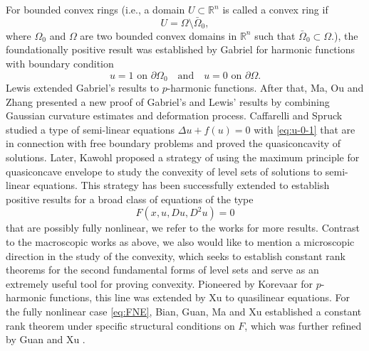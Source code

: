\documentclass[reqno]{amsart}
\theoremstyle{remark}
\theoremstyle{definition}
\numberwithin{equation}{section}
\begin{document}
For bounded convex rings (i.e., a domain $U\subset\mathbb{R}^n$ is called a convex ring if $$U=\Omega\setminus\bar{\Omega}_0,$$ 
where $\Omega_0$ and $\Omega$ are two bounded convex domains in $\mathbb{R}^n$ such that $\bar{\Omega}_0\subset\Omega$.), the foundationally positive result was established by Gabriel \cite{Gabriel-1957} for harmonic functions with boundary condition
\begin{equation}\label{eq:u-0-1}
	u=1\text{ on }\partial\Omega_0\quad\text{and}\quad u=0\text{ on }\partial\Omega.
\end{equation}
Lewis \cite{Lewis-1977} extended Gabriel's results to $p$-harmonic functions. After that, Ma, Ou and Zhang \cite{Ma-Ou-Zhang-CPAM} presented a new proof of Gabriel's and Lewis' results by combining Gaussian curvature estimates and deformation process. Caffarelli and Spruck \cite{Caffarelli-Spruck-1982} studied a type of semi-linear equations $\Delta u+f(u)=0$ with \eqref{eq:u-0-1} that are in connection with free boundary problems and proved the quasiconcavity of solutions. Later, Kawohl \cite{Kawohl-1985} proposed a strategy of using the maximum principle for quasiconcave envelope to study the convexity of level sets of solutions to semi-linear equations. This strategy has been successfully extended to establish positive results for a broad class of equations of the type 
\begin{equation}\label{eq:FNE}
	F(x,u,Du,D^2u)=0
\end{equation} 
that are possibly fully nonlinear, we refer to the works \cite{Bian-Long-Salani-2009, Colesanti-Salani-2003, Cuoghi-Salani-2006, Longinetti-Slani-2207} for more results. Contrast to the macroscopic works as above, we also would like to mention a microscopic direction in the study of the convexity, which seeks to establish constant rank theorems for the second fundamental forms of level sets and serve as an extremely useful tool for proving convexity. Pioneered by Korevaar \cite{Korevaar-1990} for $p$-harmonic functions, this line was extended by Xu \cite{Xu-CVPDE} to quasilinear equations. For the fully nonlinear case \eqref{eq:FNE}, Bian, Guan, Ma and Xu \cite{Bian-2011} established a constant rank theorem under specific structural conditions on $F$, which was further refined by Guan and Xu \cite{Guan-Xu-JRAM}.
\end{document}
